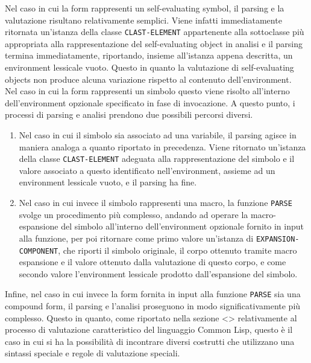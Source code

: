 Nel caso in cui la form rappresenti un self-evaluating symbol, il parsing e la
valutazione risultano relativamente semplici. Viene infatti immediatamente
ritornata un’istanza della classe \texttt{CLAST-ELEMENT} appartenente alla
sottoclasse più appropriata alla rappresentazione del self-evaluating object
in analisi e il parsing termina immediatamente, riportando, insieme
all’istanza appena descritta, un environment lessicale vuoto. Questo in quanto
la valutazione di self-evaluating objects non produce alcuna variazione
rispetto al contenuto dell'environment.\\

Nel caso in cui la form rappresenti un simbolo questo viene risolto all’interno
dell’environment opzionale specificato in fase di invocazione. A questo punto, i
processi di parsing e analisi prendono due possibili percorsi diversi.

\begin{enumerate}

\item Nel caso in cui il simbolo sia associato ad una variabile, il parsing
agisce in maniera analoga a quanto riportato in precedenza. Viene ritornato
un’istanza della classe \texttt{CLAST-ELEMENT} adeguata alla rappresentazione
del simbolo e il valore associato a questo identificato nell’environment,
assieme ad un environment lessicale vuoto, e il parsing ha fine.

\item Nel caso in cui invece il simbolo rappresenti una macro, la funzione
\texttt{PARSE} svolge un procedimento più complesso, andando ad operare la
macro-espansione del simbolo all’interno dell’environment opzionale fornito in
input alla funzione, per poi ritornare come primo valore un’istanza di \texttt
{EXPANSION-COMPONENT}, che riporti il simbolo originale, il corpo ottenuto
tramite macro espansione e il valore ottenuto dalla valutazione di questo
corpo, e come secondo valore l’environment lessicale prodotto dall’espansione
del simbolo.

\end{enumerate}

Infine, nel caso in cui invece la form fornita in input alla funzione
\texttt{PARSE} sia una compound form, il parsing e l’analisi proseguono in
modo significativamente più complesso. Questo in quanto, come riportato nella
sezione <> relativamente al processo di valutazione caratteristico del
linguaggio Common Lisp, questo è il caso in cui si ha la possibilità di
incontrare diversi costrutti che utilizzano una sintassi speciale e regole di
valutazione speciali.\\

